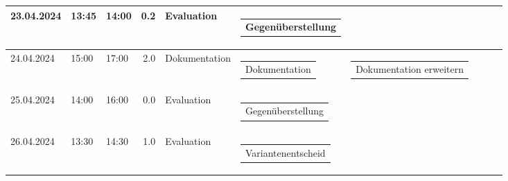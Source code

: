 {\begin{longtable}[H]{lllrllllll}
23.04.2024 & 13:45 & 14:00 & 0.2 & Evaluation & \begin{tabular}[c]{@{}l@{}}Gegenüberstellung\end{tabular} & \begin{tabular}[c]{@{}l@{}}\end{tabular} & \begin{tabular}[c]{@{}l@{}}\end{tabular} & \begin{tabular}[c]{@{}l@{}}\end{tabular} & \begin{tabular}[c]{@{}l@{}}\end{tabular} \\ \midrule
24.04.2024 & 15:00 & 17:00 & 2.0 & Dokumentation & \begin{tabular}[c]{@{}l@{}}Dokumentation\end{tabular} & \begin{tabular}[c]{@{}l@{}}Dokumentation erweitern\end{tabular} & \begin{tabular}[c]{@{}l@{}}\end{tabular} & \begin{tabular}[c]{@{}l@{}}\end{tabular} & \begin{tabular}[c]{@{}l@{}}\end{tabular} \\ \midrule
25.04.2024 & 14:00 & 16:00 & 0.0 & Evaluation & \begin{tabular}[c]{@{}l@{}}Gegenüberstellung\end{tabular} & \begin{tabular}[c]{@{}l@{}}\end{tabular} & \begin{tabular}[c]{@{}l@{}}\end{tabular} & \begin{tabular}[c]{@{}l@{}}\end{tabular} & \begin{tabular}[c]{@{}l@{}}\end{tabular} \\ \midrule
26.04.2024 & 13:30 & 14:30 & 1.0 & Evaluation & \begin{tabular}[c]{@{}l@{}}Variantenentscheid\end{tabular} & \begin{tabular}[c]{@{}l@{}}\end{tabular} & \begin{tabular}[c]{@{}l@{}}\end{tabular} & \begin{tabular}[c]{@{}l@{}}\end{tabular} & \begin{tabular}[c]{@{}l@{}}\end{tabular} \\ \midrule

\end{longtable}}
